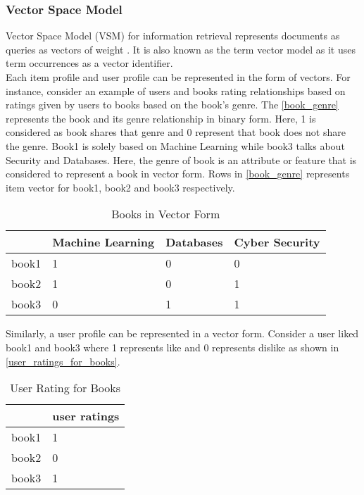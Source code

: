\subsubsection{Vector Space Model}
\label{vector_space_model}
Vector Space Model (VSM) for information retrieval represents documents as queries as vectors of weight \cite{46}. It is also known as the term vector model as it uses term occurrences as a vector identifier. 
\\
Each item profile and user profile can be represented in the form of vectors. For instance, consider an example of users and books rating relationships based on ratings given by users to books based on the book's genre. The \autoref{book_genre} represents the book and its genre relationship in binary form. Here, 1 is considered as book shares that genre and 0 represent that book does not share the genre. Book1 is solely based on Machine Learning while book3 talks about Security and Databases. Here, the genre of book is an attribute or feature that is considered to represent a book in vector form. Rows in \autoref{book_genre} represents item vector for book1, book2 and book3 respectively.   

\begin{table}[]
\centering

\begin{tabular}{|l|l|l|l|}
\hline
      & Machine Learning & Databases & Cyber Security \\ \hline
book1 & 1                & 0         & 0              \\ \hline
book2 & 1                & 0         & 1              \\ \hline
book3 & 0                & 1         & 1              \\ \hline
\end{tabular}
\caption{Books in Vector Form}

\label{book_genre}
\end{table} 

\noindent
Similarly, a user profile can be represented in a vector form. Consider a user liked book1 and book3 where 1 represents like and 0 represents dislike as shown in \autoref{user_ratings_for_books}. 

\begin{table}[]
\centering
\begin{tabular}{|l|l|}
\hline
      & user ratings \\ \hline
book1 & 1            \\ \hline
book2 & 0            \\ \hline
book3 & 1            \\ \hline
\end{tabular}
\caption{User Rating for Books}
\label{user_ratings_for_books}
\end{table}

